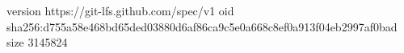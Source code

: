 version https://git-lfs.github.com/spec/v1
oid sha256:d755a58e468bd65ded03880d6af86ca9c5e0a668c8ef0a913f04eb2997af0bad
size 3145824
